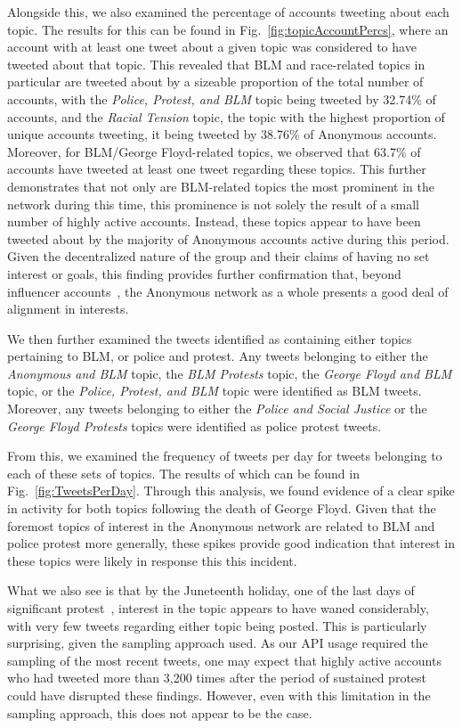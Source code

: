 \documentclass[letterpaper]{article}
\begin{document}
Alongside this, we also examined the percentage of accounts tweeting about each topic. The results for this can be found in Fig.~\ref{fig:topicAccountPercs}, where an account with at least one tweet about a given topic was considered to have tweeted about that topic. This revealed that BLM and race-related topics in particular are tweeted about by a sizeable proportion of the total number of accounts, with the \textit{Police, Protest, and BLM} topic being tweeted by 32.74\% of accounts, and the \textit{Racial Tension} topic, the topic with the highest proportion of unique accounts tweeting, it being tweeted by 38.76\% of Anonymous accounts. Moreover, for BLM/George Floyd-related topics, we observed that 63.7\% of accounts have tweeted at least one tweet regarding these topics. This further demonstrates that not only are BLM-related topics the most prominent in the network during this time, this prominence is not solely the result of a small number of highly active accounts. Instead, these topics appear to have been tweeted about by the majority of Anonymous accounts active during this period. Given the decentralized nature of the group and their claims of having no set interest or goals, this finding provides further confirmation that, beyond influencer accounts~\cite{Jones2020}, the Anonymous network as a whole presents a good deal of alignment in interests.

We then further examined the tweets identified as containing either topics pertaining to BLM, or police and protest. Any tweets belonging to either the \textit{Anonymous and BLM} topic, the \textit{BLM Protests} topic, the \textit{George Floyd and BLM} topic, or the \textit{Police, Protest, and BLM} topic were identified as BLM tweets. Moreover, any tweets belonging to either the \textit{Police and Social Justice} or the \textit{George Floyd Protests} topics were identified as police protest tweets.

From this, we examined the frequency of tweets per day for tweets belonging to each of these sets of topics. The results of which can be found in Fig.~\ref{fig:TweetsPerDay}. Through this analysis, we found evidence of a clear spike in activity for both topics following the death of George Floyd. Given that the foremost topics of interest in the Anonymous network are related to BLM and police protest more generally, these spikes provide good indication that interest in these topics were likely in response this this incident.

What we also see is that by the Juneteenth holiday, one of the last days of significant protest~\cite{NYT2020}, interest in the topic appears to have waned considerably, with very few tweets regarding either topic being posted. This is particularly surprising, given the sampling approach used. As our API usage required the sampling of the most recent tweets, one may expect that highly active accounts who had tweeted more than 3,200 times after the period of sustained protest could have disrupted these findings. However, even with this limitation in the sampling approach, this does not appear to be the case.
\end{document}
